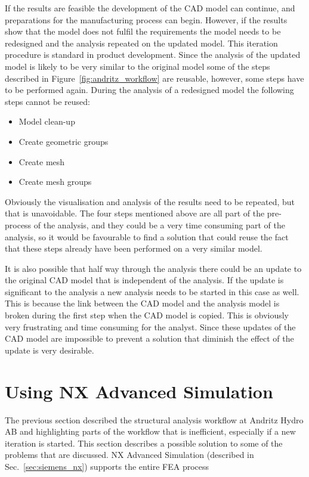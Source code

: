 If the results are feasible the development of the CAD model can continue, and preparations for the manufacturing process can begin. However, if the results show that the model does not fulfil the requirements the model needs to be redesigned and the analysis repeated on the updated model. This iteration procedure is standard in product development. Since the analysis of the updated model is likely to be very similar to the original model some of the steps described in Figure~\ref{fig:andritz_workflow} are reusable, however, some steps have to be performed again. During the analysis of a redesigned model the following steps cannot be reused:
\begin{itemize}
	\item Model clean-up
	\item Create geometric groups
	\item Create mesh
	\item Create mesh groups
\end{itemize}
Obviously the visualisation and analysis of the results need to be repeated, but that is unavoidable. The four steps mentioned above are all part of the pre-process of the analysis, and they could be a very time consuming part of the analysis, so it would be favourable to find a solution that could reuse the fact that these steps already have been performed on a very similar model. 

It is also possible that half way through the analysis there could be an update to the original CAD model that is independent of the analysis. If the update is significant to the analysis a new analysis needs to be started in this case as well. This is because the link between the CAD model and the analysis model is broken during the first step when the CAD model is copied. This is obviously very frustrating and time consuming for the analyst. Since these updates of the CAD model are impossible to prevent a solution that diminish the effect of the update is very desirable.

\section{Using NX Advanced Simulation} %
\label{sec:using_nx_advanced_simulation}
The previous section described the structural analysis workflow at Andritz Hydro AB and highlighting parts of the workflow that is inefficient, especially if a new iteration is started. This section describes a possible solution to some of the problems that are discussed. NX Advanced Simulation (described in Sec.~\ref{sec:siemens_nx}) supports the entire FEA process 

